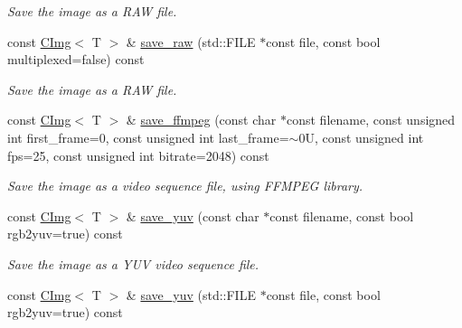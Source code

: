 \begin{DoxyCompactItemize}
\begin{DoxyCompactList}\small\item\em Save the image as a RAW file. \item\end{DoxyCompactList}\item 
\hypertarget{structcimg__library_1_1CImg_a0849f31ebd1c5ef5df85bcb942c408ae}{
const \hyperlink{structcimg__library_1_1CImg}{CImg}$<$ T $>$ \& \hyperlink{structcimg__library_1_1CImg_a0849f31ebd1c5ef5df85bcb942c408ae}{save\_\-raw} (std::FILE $\ast$const file, const bool multiplexed=false) const }
\label{structcimg__library_1_1CImg_a0849f31ebd1c5ef5df85bcb942c408ae}

\begin{DoxyCompactList}\small\item\em Save the image as a RAW file. \item\end{DoxyCompactList}\item 
\hypertarget{structcimg__library_1_1CImg_a14492b9b9d35257c1ef7abade4057e46}{
const \hyperlink{structcimg__library_1_1CImg}{CImg}$<$ T $>$ \& \hyperlink{structcimg__library_1_1CImg_a14492b9b9d35257c1ef7abade4057e46}{save\_\-ffmpeg} (const char $\ast$const filename, const unsigned int first\_\-frame=0, const unsigned int last\_\-frame=$\sim$0U, const unsigned int fps=25, const unsigned int bitrate=2048) const }
\label{structcimg__library_1_1CImg_a14492b9b9d35257c1ef7abade4057e46}

\begin{DoxyCompactList}\small\item\em Save the image as a video sequence file, using FFMPEG library. \item\end{DoxyCompactList}\item 
\hypertarget{structcimg__library_1_1CImg_a02e74b684698a0eaf533869f9e262cbb}{
const \hyperlink{structcimg__library_1_1CImg}{CImg}$<$ T $>$ \& \hyperlink{structcimg__library_1_1CImg_a02e74b684698a0eaf533869f9e262cbb}{save\_\-yuv} (const char $\ast$const filename, const bool rgb2yuv=true) const }
\label{structcimg__library_1_1CImg_a02e74b684698a0eaf533869f9e262cbb}

\begin{DoxyCompactList}\small\item\em Save the image as a YUV video sequence file. \item\end{DoxyCompactList}\item 
\hypertarget{structcimg__library_1_1CImg_af8d2ad119a104be93d1a1735faf7b957}{
const \hyperlink{structcimg__library_1_1CImg}{CImg}$<$ T $>$ \& \hyperlink{structcimg__library_1_1CImg_af8d2ad119a104be93d1a1735faf7b957}{save\_\-yuv} (std::FILE $\ast$const file, const bool rgb2yuv=true) const }
\label{structcimg__library_1_1CImg_af8d2ad119a104be93d1a1735faf7b957}


\end{DoxyCompactItemize}
